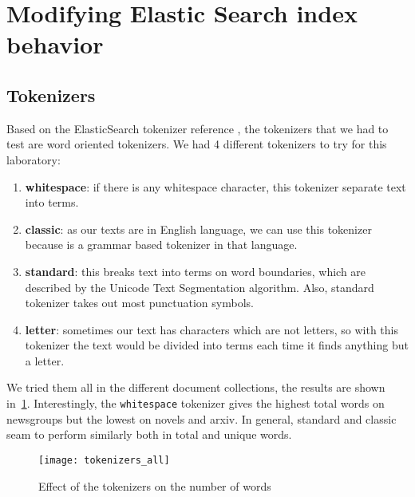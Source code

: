 \section{Modifying Elastic Search index behavior}

\subsection{Tokenizers}

Based on the ElasticSearch tokenizer reference \cite{noauthor_tokenizer_nodate}, the tokenizers that we had to test are word oriented tokenizers. We had 4 different tokenizers to try for this laboratory:
\begin{enumerate}
    \item \textbf{whitespace}: if there is any whitespace character, this tokenizer separate text into terms.
    \item \textbf{classic}: as our texts are in English language, we can use this tokenizer because is a grammar based tokenizer in that language. 
    \item \textbf{standard}: this breaks text into terms on word boundaries, which are described by the Unicode Text Segmentation algorithm. Also, standard tokenizer takes out most punctuation symbols.
    \item \textbf{letter}: sometimes our text has characters which are not letters, so with this tokenizer the text would be divided into terms each time it finds anything but a letter.
\end{enumerate}

We tried them all in the different document collections, the results
are shown in~\cref{fig:tokenizers_all}. Interestingly, the \texttt{whitespace}
tokenizer gives the highest total words on newsgroups but the lowest on novels
and arxiv. In general, standard and classic seam to perform similarly both in total
and unique words.

\begin{figure}[H]
    \centering\texttt{[image: tokenizers\_all]}
    \caption{Effect of the tokenizers on the number of words}
    \label{fig:tokenizers_all}
\end{figure}

%

